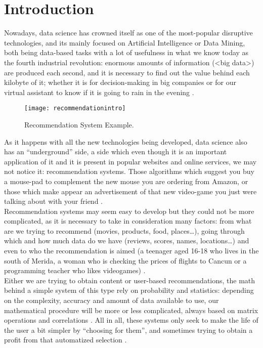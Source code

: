 \documentclass[conference]{IEEEtran}
\begin{document}
\section{Introduction}
Nowadays, data science has crowned itself as one of the most-popular disruptive technologies, and its mainly focused on Artificial Intelligence or Data Mining, both being data-based tasks with a lot of usefulness in what we know today as the fourth industrial revolution: enormous amounts of information (<big data>) are produced each second, and it is necessary to find out the value behind each kilobyte of it; whether it is for decision-making in big companies or for our virtual assistant to know if it is going to rain in the evening \cite{b1}.  
\begin{figure}[H]
	\centering
	\texttt{[image: recommendationintro]}
	\caption{Recommendation System Example.}
	\label{1}
\end{figure}
As it happens with all the new technologies being developed, data science also has an “underground” side, a side which even though it is an important application of it and it is present in popular websites and online services, we may not notice it: recommendation systems. Those algorithms which suggest you buy a mouse-pad to complement the new mouse you are ordering from Amazon, or those which make appear an advertisement of that new video-game you just were talking about with your friend \cite{b2}.
\\
Recommendation systems may seem easy to develop but they could not be more complicated, as it is necessary to take in consideration many factors: from what are we trying to recommend (movies, products, food, places…), going through which and how much data do we have (reviews, scores, names, locations…) and even to who the recommendation is aimed (a teenager aged 16-18 who lives in the south of Merida, a woman who is checking the prices of flights to Cancun or a programming teacher who likes videogames) \cite{b3}.
\\
Either we are trying to obtain content or user-based recommendations, the math behind a simple system of this type rely on probability and statistics: depending on the complexity, accuracy and amount of data available to use, our mathematical procedure will be more or less complicated, always based on matrix operations and correlations \cite{b4}. All in all, these systems only seek to make the life of the user a bit simpler by “choosing for them”, and sometimes trying to obtain a profit from that automatized selection \cite{b5}.
\end{document}
